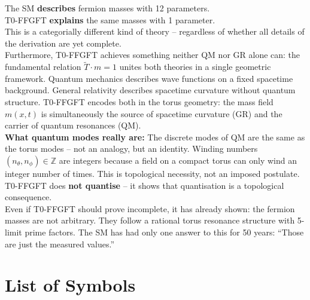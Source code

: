 \begin{predbox}
The SM \textbf{describes} fermion masses with 12 parameters.\\
T0-FFGFT \textbf{explains} the same masses with 1 parameter.\\[4pt]
This is a categorially different kind of theory -- regardless of
whether all details of the derivation are yet complete.\\[4pt]
Furthermore, T0-FFGFT achieves something neither QM nor GR alone
can: the fundamental relation $\tilde{T} \cdot m = 1$ unites both
theories in a single geometric framework.
Quantum mechanics describes wave functions on a fixed spacetime
background. General relativity describes spacetime curvature without
quantum structure. T0-FFGFT encodes both in the torus geometry:
the mass field $m(x,t)$ is simultaneously the source of spacetime
curvature (GR) and the carrier of quantum resonances (QM).\\[4pt]
\textbf{What quantum modes really are:}
The discrete modes of QM are the same as the torus modes --
not an analogy, but an identity. Winding numbers
$(n_\theta, n_\phi) \in \mathbb{Z}$ are integers because a field
on a compact torus can only wind an integer number of times.
This is topological necessity, not an imposed postulate.
T0-FFGFT does \textbf{not quantise} -- it shows that quantisation
is a topological consequence.\\[4pt]
Even if T0-FFGFT should prove incomplete, it has already shown:
the fermion masses are not arbitrary. They follow a rational
torus resonance structure with 5-limit prime factors. The SM
has had only one answer to this for 50 years:
``Those are just the measured values.''
\end{predbox}

\section*{List of Symbols}


